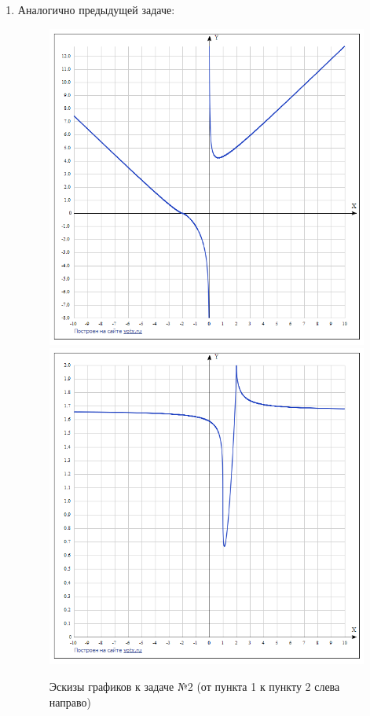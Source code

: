 \documentclass[a4paper,12pt]{article}
\begin{document}
\begin{enumerate}
     	\item Аналогично предыдущей задаче:
     	\begin{figure}[h!]
     		\includegraphics[scale=0.35]{2(1).png}
     		\includegraphics[scale=0.35]{2(2).png}
     		\caption{Эскизы графиков к задаче №2 (от пункта 1 к пункту 2 слева направо)}
		\end{figure}
     	

\end{enumerate}
\end{document}
